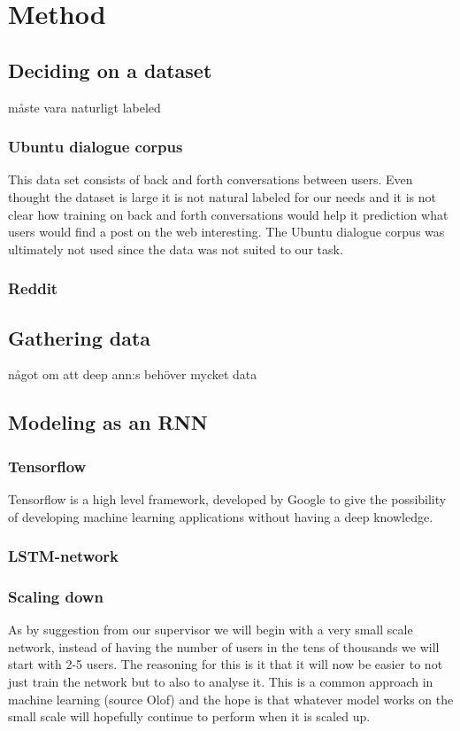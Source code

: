 \chapter{Method}%

\section{Deciding on a dataset}
måste vara naturligt labeled
\subsection{Ubuntu dialogue corpus}
This data set consists of back and forth conversations between users. Even thought the dataset is large it is not natural labeled for our needs and it is not clear how training on back and forth conversations would help it prediction what users would find a post on the web interesting. The Ubuntu dialogue corpus was ultimately not used since the data was not suited to our task.
\subsection{Reddit}
\section{Gathering data}
något om att deep ann:s behöver mycket data %
\section{Modeling as an RNN}
\subsection{Tensorflow}%
Tensorflow is a high level framework, developed by Google to give the possibility of developing machine learning applications without having a deep knowledge. %
\subsection{LSTM-network}
\subsection{Scaling down}
As by suggestion from our supervisor we will begin with a very small scale network, instead of having the number of users in the tens of thousands we will start with 2-5 users. The reasoning for this is it that it will now be easier to not just train the network but to also to analyse it. This is a common approach in machine learning (source Olof) and the hope is that whatever model works on the small scale will hopefully continue to perform when it is scaled up.    
